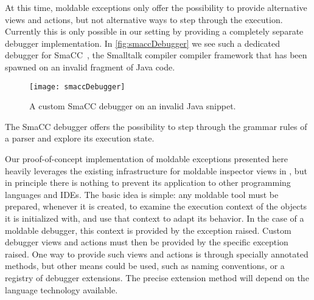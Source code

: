 \documentclass[sigplan,10pt]{acmart}
\newcommand\on[1]{\nbc{ON}{#1}{olive}} %
\newcommand\ac[1]{\nbc{AC}{#1}{teal}}
\newcommand{\GT}{\lst{GT}\xspace} %
\begin{document}
At this time, moldable exceptions only offer the possibility to provide alternative views and actions, but not alternative ways to step through the execution.
Currently this is only possible in our setting by providing a completely separate debugger implementation.
In \autoref{fig:smaccDebugger} we see such a dedicated debugger for SmaCC~\cite{Brant17a}, the Smalltalk compiler compiler framework that has been spawned on an invalid fragment of Java code.
\begin{figure}[h]
  \texttt{[image: smaccDebugger]}
  \caption{A custom SmaCC debugger on an invalid Java snippet.}
  \label{fig:smaccDebugger}
\end{figure}
The SmaCC debugger offers the possibility to step through the grammar rules of a parser and explore its execution state.

\on{AC -- is there more to say?}

Our proof-of-concept implementation of moldable exceptions presented here heavily leverages the existing infrastructure for moldable inspector views in \GT, but in principle there is nothing to prevent its application to other programming languages and IDEs.
The basic idea is simple: any moldable tool must be prepared, whenever it is created, to examine the execution context of the objects it is initialized with, and use that context to adapt its behavior.
In the case of a moldable debugger, this context is provided by the exception raised.
Custom debugger views and actions must then be provided by the specific exception raised.
One way to provide such views and actions is through specially annotated methods, but other means could be used, such as naming conventions, or a registry of debugger extensions.
The precise extension method will depend on the language technology available.

\end{document}
